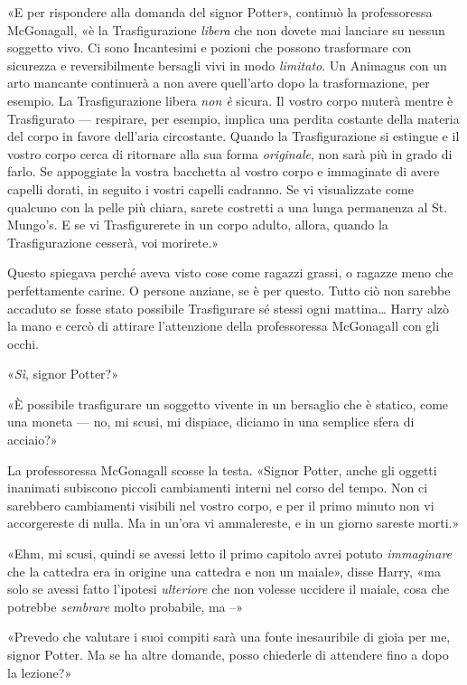 «E per rispondere alla domanda del signor Potter», continuò la professoressa McGonagall, «è la Trasfigurazione \textit{libera} che non dovete mai lanciare su nessun soggetto vivo. Ci sono Incantesimi e pozioni che possono trasformare con sicurezza e reversibilmente bersagli vivi in modo \textit{limitato}. Un Animagus con un arto mancante continuerà a non avere quell’arto dopo la trasformazione, per esempio. La Trasfigurazione libera \textit{non è} sicura. Il vostro corpo muterà mentre è Trasfigurato — respirare, per esempio, implica una perdita costante della materia del corpo in favore dell’aria circostante. Quando la Trasfigurazione si estingue e il vostro corpo cerca di ritornare alla sua forma \textit{originale}, non sarà più in grado di farlo. Se appoggiate la vostra bacchetta al vostro corpo e immaginate di avere capelli dorati, in seguito i vostri capelli cadranno. Se vi visualizzate come qualcuno con la pelle più chiara, sarete costretti a una lunga permanenza al St. Mungo’s. E se vi Trasfigurerete in un corpo adulto, allora, quando la Trasfigurazione cesserà, voi morirete.»

Questo spiegava perché aveva visto cose come ragazzi grassi, o ragazze meno che perfettamente carine. O persone anziane, se è per questo. Tutto ciò non sarebbe accaduto se fosse stato possibile Trasfigurare sé stessi ogni mattina… Harry alzò la mano e cercò di attirare l’attenzione della professoressa McGonagall con gli occhi.

«\textit{Sì}, signor Potter?»

«È possibile trasfigurare un soggetto vivente in un bersaglio che è statico, come una moneta — no, mi scusi, mi dispiace, diciamo in una semplice sfera di acciaio?»

La professoressa McGonagall scosse la testa. «Signor Potter, anche gli oggetti inanimati subiscono piccoli cambiamenti interni nel corso del tempo. Non ci sarebbero cambiamenti visibili nel vostro corpo, e per il primo minuto non vi accorgereste di nulla. Ma in un’ora vi ammalereste, e in un giorno sareste morti.»

«Ehm, mi scusi, quindi se avessi letto il primo capitolo avrei potuto \textit{immaginare} che la cattedra era in origine una cattedra e non un maiale», disse Harry, «ma solo se avessi fatto l’ipotesi \textit{ulteriore} che non volesse uccidere il maiale, cosa che potrebbe \textit{sembrare} molto probabile, ma –»

«Prevedo che valutare i suoi compiti sarà una fonte inesauribile di gioia per me, signor Potter. Ma se ha altre domande, posso chiederle di attendere fino a dopo la lezione?»

